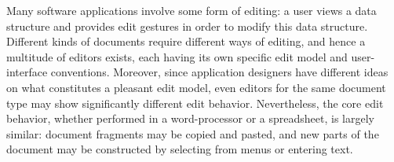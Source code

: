 \documentclass{speauth}
\begin{document}
\newcommand{\editScrshot}[3]{\fbox{%
\parbox{#1mm}{
\begin{center} #2\\
{\vspace{3mm}\small #3}
\end{center}
}}}
\newcommand{\thenn}{\hspace{1mm}$\Rightarrow$\hspace{1mm}}


\newcommand{\editStepScrshot}[4]{%
\begin{center}
\hspace{\stretch{1}}\fbox{
\begin{tabular}[c]{@{}c@{}} \\ [-3mm]
#1 \\ [1mm]
\end{tabular}
}
\thenn
\fbox{
\begin{tabular}[c]{@{}c@{}} \\ [-3mm]
#2 \\ [1mm]
\end{tabular}
} \hspace*{\stretch{1}} \nopagebreak[4] \\ [3mm]
\nopagebreak[4] \hspace*{#3}{#4}\\
\end{center}}

\newcommand{\editStepScrshotChk}[4]{%
\editStepScrshot{#1}{#2}{#3}{#4}
\begin{center}
$\Rightarrow$\\
{#4}
\end{center}
}

\newcommand{\editStepScrshotSz}[5]{%
\editStepScrshot{\parbox{#1}{#2}}{\parbox{#1}{#3}}{#4}{#5}
}

Many software applications involve some form of editing: a user views a data structure and provides edit gestures in order to modify this data structure. Different kinds of documents require different ways of editing, and hence a multitude of editors exists, each having its own specific edit model and user-interface conventions. Moreover, since application designers have different ideas on what constitutes a pleasant edit model, even editors for the same document type may show significantly different edit behavior. Nevertheless, the core edit behavior, whether performed in a word-processor or a spreadsheet, is largely similar: document fragments may be copied and pasted, and new parts of the document may be constructed by selecting from menus or entering text. 
\end{document}
